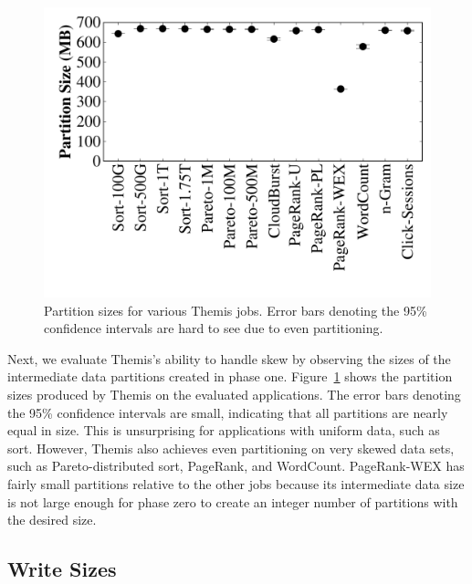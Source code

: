 \begin{figure}
  \includegraphics[width=\columnwidth]{themis/graphs/ld_sizes_plot.pdf}
  \caption{\label{fig:ld_sizes} Partition sizes for various Themis
    jobs. Error bars denoting the 95\% confidence intervals are hard to see
    due to even partitioning.}
\end{figure}

Next, we evaluate Themis's ability to handle skew by observing the sizes of
the intermediate data partitions created in phase one.
Figure~\ref{fig:ld_sizes} shows the partition sizes produced by Themis on the
evaluated applications. The error bars denoting the 95\% confidence intervals
are small, indicating that all partitions are nearly equal in size. This is
unsurprising for applications with uniform data, such as sort. However, Themis
also achieves even partitioning on very skewed data sets, such as
Pareto-distributed sort, PageRank, and WordCount. PageRank-WEX has fairly small
partitions relative to the other jobs because its intermediate data size is not
large enough for phase zero to create an integer number of partitions with the
desired size.

\subsection{Write Sizes}

